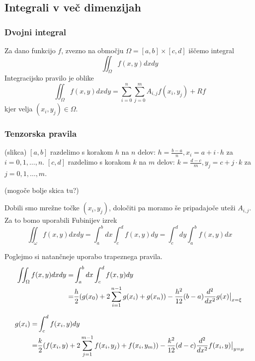 \documentclass[a4paper,12pt]{article}
\theoremstyle{definition}
\theoremstyle{remark}
\newcommand\restr[2]{{%
  \left.\kern-\nulldelimiterspace %
  #1 %
  \littletaller %
  \right|_{#2} %
  }}
\newcommand{\littletaller}{\mathchoice{\vphantom{\big|}}{}{}{}}
\begin{document}
\subsection{Integrali v več dimenzijah}
\subsubsection{Dvojni integral}
Za dano funkcijo $f$, zvezno na območju $\Omega = [a, b] \times [c, d]$ iščemo integral
\begin{equation*}
    \iint_{\Omega} f(x, y) dx dy
\end{equation*}
Integracijsko pravilo je oblike
\begin{equation*}
    \iint_{\Omega} f(x, y) dx dy = \sum_{i=0}^{n} \sum_{j = 0}^{m} A_{i, j} f(x_i, y_j) + Rf
\end{equation*}
kjer velja $(x_i, y_j) \in \Omega$.

\subsubsection{Tenzorska pravila}
(slikca)
$[a, b]$ razdelimo s korakom $h$ na $n$ delov: $h = \frac{b-a}{n}, x_i = a + i \cdot h$ za $i = 0, 1, \dots, n$.
$[c, d]$ razdelimo s korakom $k$ na $m$ delov: $k = \frac{d-c}{m}, y_j = c + j \cdot k$ za $j = 0, 1, \dots, m$.

(mogoče bolje skica tu?)

Dobili smo mrežne točke $(x_i, y_j)$, določiti pa moramo še pripadajoče uteži $A_{i, j}$. Za to bomo uporabili Fubinijev izrek
\begin{equation*}
    \iint_{\omega} f(x, y) dx dy = \int_{a}^{b} dx \int_{c}^{d} f(x, y) dy = \int_{c}^{d} dy \int_{a}^{b} f(x, y) dx
\end{equation*}

Poglejmo si natančneje uporabo trapeznega pravila.
\begin{align*}
    \iint_{\Omega} f(x, y) dx dy =& \int_{a}^{b} dx \int_{c}^{d} f(x, y) dy \\
                                 =& \frac{h}{2} (g(x_0) + 2 \sum_{i=1}^{n-1} g(x_i) + g(x_n)) - \frac{h^2}{12} (b-a) \frac{d^2}{dx^2} g(x) \restr{}{x=\xi}
\end{align*}

\begin{align*}
    g(x_i) =& \int_{c}^{d} f(x_i, y) dy \\
           =& \frac{k}{2} (f(x_i,y) + 2 \sum_{j=1}^{m-1} f(x_i, y_j) + f(x_i, y_m)) - \frac{k^2}{12}(d-c) \frac{d^2}{dx^2} f(x_i, y) \restr{}{y=\mu}
\end{align*}
\end{document}
